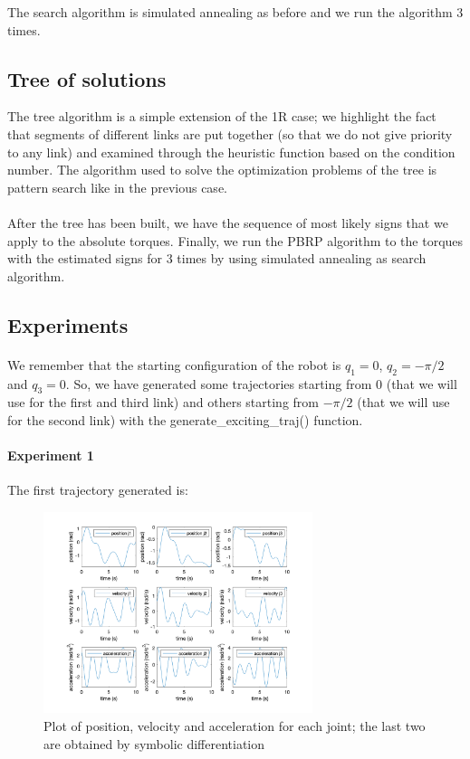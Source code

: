 \documentclass{article}
\begin{document}
The search algorithm is simulated annealing as before and we run the algorithm 3 times.

\subsection{Tree of solutions}
The tree algorithm is a simple extension of the 1R case; we highlight the fact that segments of different links are put together (so that we do not give priority to any link) and examined through the heuristic function based on the condition number. The algorithm used to solve the optimization problems of the tree is pattern search like in the previous case.
\\\\
After the tree has been built, we have the sequence of most likely signs that we apply to the absolute torques. Finally, we run the PBRP algorithm to the torques with the estimated signs for 3 times by using simulated annealing as search algorithm.

\subsection{Experiments}
\paragraph{}We remember that the starting configuration of the robot is $q_1 = 0$, $q_2 = -\pi/2$ and $q_3 = 0$. So, we have generated some trajectories starting from 0 (that we will use for the first and third link) and others starting from $-\pi/2$ (that we will use for the second link) with the generate\_exciting\_traj() function.

\paragraph{Experiment 1}
The first trajectory generated is:
\begin{figure}[!htbp]
\centering
\includegraphics[width=0.7\textwidth]{images/3-dof/trajectory123.png}
\caption{Plot of position, velocity and acceleration for each joint; the last two are obtained by symbolic differentiation}
\end{figure}
\end{document}
